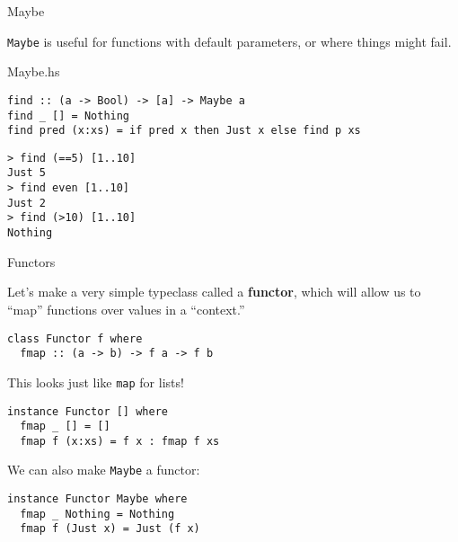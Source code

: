 %
\begin{frame}[fragile]{Maybe}

\texttt{Maybe} is useful for functions with default parameters, or where things
might fail.

\begin{block}{Maybe.hs}
\begin{verbatim}
find :: (a -> Bool) -> [a] -> Maybe a
find _ [] = Nothing
find pred (x:xs) = if pred x then Just x else find p xs
\end{verbatim}
\end{block}

\begin{block}{}
\begin{verbatim}
> find (==5) [1..10]
Just 5
> find even [1..10]
Just 2
> find (>10) [1..10]
Nothing
\end{verbatim}
\end{block}

\end{frame}

%
\begin{frame}[fragile]{Functors}

Let's make a very simple typeclass called a \textbf{functor}, which will allow
us to ``map'' functions over values in a ``context.''

\begin{block}{}
\begin{verbatim}
class Functor f where
  fmap :: (a -> b) -> f a -> f b
\end{verbatim}
\end{block}

This looks just like \texttt{map} for lists!

\begin{block}{}
\begin{verbatim}
instance Functor [] where
  fmap _ [] = []
  fmap f (x:xs) = f x : fmap f xs
\end{verbatim}
\end{block}

We can also make \texttt{Maybe} a functor:

\begin{block}{}
\begin{verbatim}
instance Functor Maybe where
  fmap _ Nothing = Nothing
  fmap f (Just x) = Just (f x)
\end{verbatim}
\end{block}

\end{frame}

